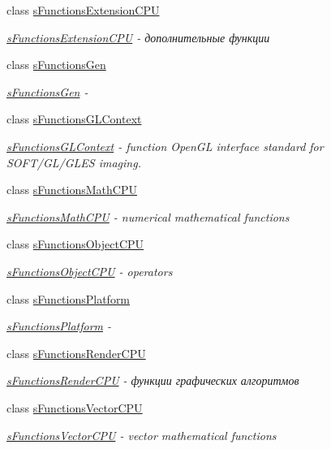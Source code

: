 \begin{DoxyCompactItemize}
class \hyperlink{structs_functions_extension_c_p_u}{s\-Functions\-Extension\-C\-P\-U}
\begin{DoxyCompactList}\small\item\em \hyperlink{structs_functions_extension_c_p_u}{s\-Functions\-Extension\-C\-P\-U} -\/ дополнительные функции \end{DoxyCompactList}\item 
class \hyperlink{structs_functions_gen}{s\-Functions\-Gen}
\begin{DoxyCompactList}\small\item\em \hyperlink{structs_functions_gen}{s\-Functions\-Gen} -\/ \end{DoxyCompactList}\item 
class \hyperlink{structs_functions_g_l_context}{s\-Functions\-G\-L\-Context}
\begin{DoxyCompactList}\small\item\em \hyperlink{structs_functions_g_l_context}{s\-Functions\-G\-L\-Context} -\/ function Open\-G\-L interface standard for S\-O\-F\-T/\-G\-L/\-G\-L\-E\-S imaging. \end{DoxyCompactList}\item 
class \hyperlink{structs_functions_math_c_p_u}{s\-Functions\-Math\-C\-P\-U}
\begin{DoxyCompactList}\small\item\em \hyperlink{structs_functions_math_c_p_u}{s\-Functions\-Math\-C\-P\-U} -\/ numerical mathematical functions \end{DoxyCompactList}\item 
class \hyperlink{structs_functions_object_c_p_u}{s\-Functions\-Object\-C\-P\-U}
\begin{DoxyCompactList}\small\item\em \hyperlink{structs_functions_object_c_p_u}{s\-Functions\-Object\-C\-P\-U} -\/ operators \end{DoxyCompactList}\item 
class \hyperlink{structs_functions_platform}{s\-Functions\-Platform}
\begin{DoxyCompactList}\small\item\em \hyperlink{structs_functions_platform}{s\-Functions\-Platform} -\/ \end{DoxyCompactList}\item 
class \hyperlink{structs_functions_render_c_p_u}{s\-Functions\-Render\-C\-P\-U}
\begin{DoxyCompactList}\small\item\em \hyperlink{structs_functions_render_c_p_u}{s\-Functions\-Render\-C\-P\-U} -\/ функции графических алгоритмов \end{DoxyCompactList}\item 
class \hyperlink{structs_functions_vector_c_p_u}{s\-Functions\-Vector\-C\-P\-U}
\begin{DoxyCompactList}\small\item\em \hyperlink{structs_functions_vector_c_p_u}{s\-Functions\-Vector\-C\-P\-U} -\/ vector mathematical functions \end{DoxyCompactList}\end{DoxyCompactItemize}
